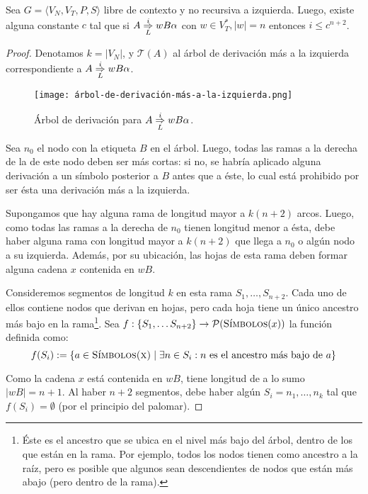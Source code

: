 \begin{theorem*}
    Sea $G = \langle V_N, V_T, P, S \rangle$ libre de contexto y no recursiva a izquierda. Luego, existe alguna constante $c$ tal que si $A \overset{i}{\underset{L}{\Rightarrow}} w B \alpha$ con $w \in V_T^*, |w| = n$ entonces $i \leq c^{n + 2}$.
\end{theorem*}
\begin{proof}
    Denotamos $k = |V_N|$, y $\mathcal T(A)$ al árbol de derivación más a la izquierda correspondiente a $A \overset{i}{\underset{L}{\Rightarrow}} w B \alpha$.
    \begin{figure}[H]
        \centering
        \texttt{[image: árbol-de-derivación-más-a-la-izquierda.png]}
        \caption*{Árbol de derivación para $A \overset{i}{\underset{L}{\Rightarrow}} w B \alpha$.}
    \end{figure}

    Sea $n_0$ el nodo con la etiqueta $B$ en el árbol. Luego, todas las ramas a la derecha de la de este nodo deben ser más cortas: si no, se habría aplicado alguna derivación a un símbolo posterior a $B$ antes que a éste, lo cual está prohibido por ser ésta una derivación más a la izquierda.

    Supongamos que hay alguna rama de longitud mayor a $k (n + 2)$ arcos. Luego, como todas las ramas a la derecha de $n_0$ tienen longitud menor a ésta, debe haber alguna rama con longitud mayor a $k (n + 2)$ que llega a $n_0$ o algún nodo a su izquierda. Además, por su ubicación, las hojas de esta rama deben formar alguna cadena $x$ contenida en $wB$.

    Consideremos segmentos de longitud $k$ en esta rama $S_1, \dots, S_{n + 2}$. Cada uno de ellos contiene nodos que derivan en hojas, pero cada hoja tiene un único ancestro más bajo en la rama\footnote{Éste es el ancestro que se ubica en el nivel más bajo del árbol, dentro de los que están en la rama. Por ejemplo, todos los nodos tienen como ancestro a la raíz, pero es posible que algunos sean descendientes de nodos que están más abajo (pero dentro de la rama).}. Sea $f: \{S_1, \dots S_{n + 2}\} \to \mathcal P(\textsc{Símbolos}(x))$ la función definida como:
    $$
        f(S_i) := \{a \in \textsc{Símbolos(x)} \mid \exists n \in S_i : n \text{ es el ancestro más bajo de } a\}
    $$

    Como la cadena $x$ está contenida en $wB$, tiene longitud de a lo sumo $|wB| = n + 1$. Al haber $n + 2$ segmentos, debe haber algún $S_i = n_1, \dots, n_k$ tal que $f(S_i) = \emptyset$ (por el principio del palomar).  
    

\end{proof}
